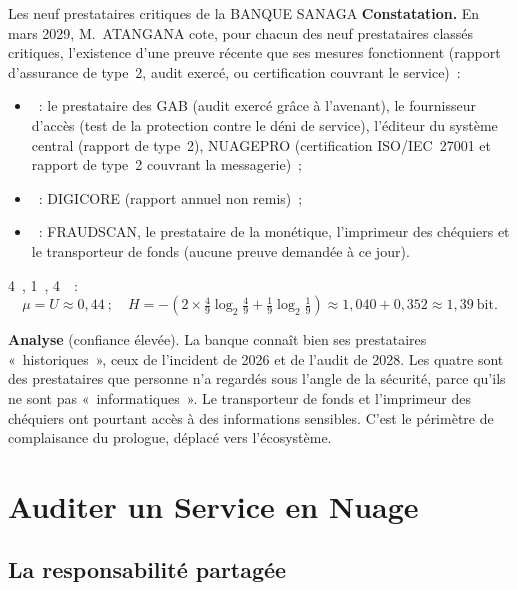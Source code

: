 \begin{boxlecture}{Les neuf prestataires critiques de la BANQUE SANAGA}
\textbf{Constatation.} En mars 2029, M.~ATANGANA cote, pour chacun des neuf
prestataires classés critiques, l'existence d'une preuve récente que ses
mesures fonctionnent (rapport d'assurance de type~2, audit exercé, ou
certification couvrant le service)~:
\begin{itemize}
    \item \OUI{}~: le prestataire des GAB (audit exercé grâce à
          l'avenant), le fournisseur d'accès (test de la protection contre
          le déni de service), l'éditeur du système central (rapport de
          type~2), NUAGEPRO (certification ISO/IEC~27001 et rapport de
          type~2 couvrant la messagerie)~;
    \item \NON{}~: DIGICORE (rapport annuel non remis)~;
    \item \NEK{}~: FRAUDSCAN, le prestataire de la monétique, l'imprimeur
          des chéquiers et le transporteur de fonds (aucune preuve demandée
          à ce jour).
\end{itemize}
4~\OUI{}, 1~\NON{}, 4~\NEK{}~:
\[
\mu = U \approx 0{,}44~;\quad
H = -\left(2 \times \tfrac{4}{9}\log_2\tfrac{4}{9} + \tfrac{1}{9}\log_2\tfrac{1}{9}\right)
  \approx 1{,}040 + 0{,}352 \approx 1{,}39~\text{bit}.
\]

\textbf{Analyse} (confiance élevée). La banque connaît bien ses prestataires
«~historiques~», ceux de l'incident de 2026 et de l'audit de 2028. Les
quatre \NEK{} sont des prestataires que personne n'a regardés sous l'angle
de la sécurité, parce qu'ils ne sont pas «~informatiques~». Le transporteur
de fonds et l'imprimeur des chéquiers ont pourtant accès à des
informations sensibles. C'est le périmètre de complaisance du prologue,
déplacé vers l'écosystème.

\medskip
\hfill{}
\end{boxlecture}

\section{Auditer un Service en Nuage}
\label{sec:c15-nuage}

\subsection{La responsabilité partagée}

